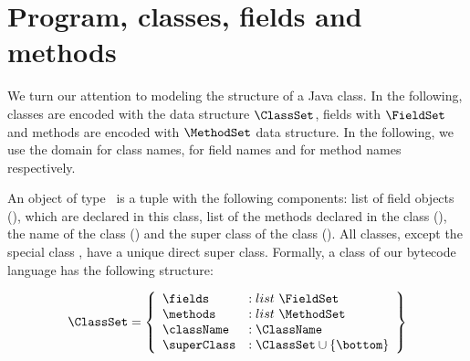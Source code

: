 
 \section{Program, classes, fields and methods}\label{clazz}
 
 We turn our attention to modeling the structure of a Java class. In the following, classes are encoded with the data structure $\ClassSet$,  fields with $\FieldSet$ and
 methods are encoded with $\MethodSet$ data structure.  In the following, we  use  the  domain  \ClassName{} for class names, \FieldName{}  for field names and  \MethodName{} for method names  respectively.

 An object of type \ClassSet \ is a tuple with the following components: list of field objects (\fields), which are declared in this class,
 list of the methods declared in the class (\methods), the name of the class (\className)   and the super class of the class (\superClass).
 All classes, except the special class \Object, have a unique direct super class. Formally, a class of our bytecode language 
 has the following structure:


 $$ \begin{array}{l}
         \ClassSet = \left\{\begin{array}{ll} \fields    & :    list \ \FieldSet \\
                                          \methods    & :    list \ \MethodSet \\
					  \className  & :   \ClassName \\
					  \superClass & :   \ClassSet \cup \{ \bottom \}
                    \end{array} \right\}
   \end{array} $$


